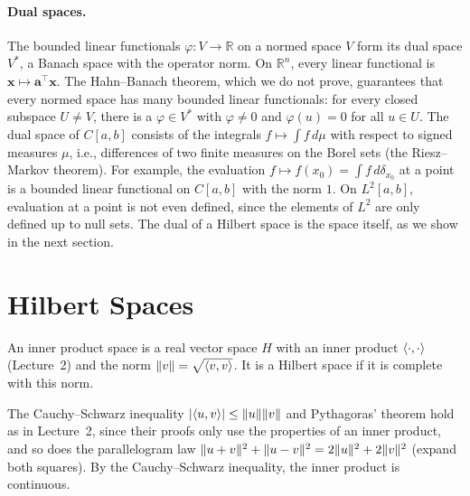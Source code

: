 \paragraph{Dual spaces.} The bounded linear functionals $\varphi: V \to \mathbb{R}$ on a normed space $V$ form its dual space $V^*$, a Banach space with the operator norm. On $\mathbb{R}^n$, every linear functional is $\mathbf{x} \mapsto \mathbf{a}^\top\mathbf{x}$. The Hahn--Banach theorem, which we do not prove, guarantees that every normed space has many bounded linear functionals: for every closed subspace $U \neq V$, there is a $\varphi \in V^*$ with $\varphi \neq 0$ and $\varphi(u) = 0$ for all $u \in U$. The dual space of $C[a, b]$ consists of the integrals $f \mapsto \int f\, d\mu$ with respect to signed measures $\mu$, i.e., differences of two finite measures on the Borel sets (the Riesz--Markov theorem). For example, the evaluation $f \mapsto f(x_0) = \int f\, d\delta_{x_0}$ at a point is a bounded linear functional on $C[a, b]$ with the norm $1$. On $L^2[a, b]$, evaluation at a point is not even defined, since the elements of $L^2$ are only defined up to null sets. The dual of a Hilbert space is the space itself, as we show in the next section.

\section{Hilbert Spaces}\label{A-sec:hilbert}

\begin{definition}\label{A-def:hilbert}
    An inner product space is a real vector space $H$ with an inner product $\langle \cdot, \cdot \rangle$ (Lecture~2) and the norm $\lVert v \rVert = \sqrt{\langle v, v \rangle}$. It is a Hilbert space if it is complete with this norm.
\end{definition}

The Cauchy--Schwarz inequality $|\langle u, v \rangle| \leq \lVert u \rVert\lVert v \rVert$ and Pythagoras' theorem hold as in Lecture~2, since their proofs only use the properties of an inner product, and so does the parallelogram law $\lVert u + v \rVert^2 + \lVert u - v \rVert^2 = 2\lVert u \rVert^2 + 2\lVert v \rVert^2$ (expand both squares). By the Cauchy--Schwarz inequality, the inner product is continuous.

